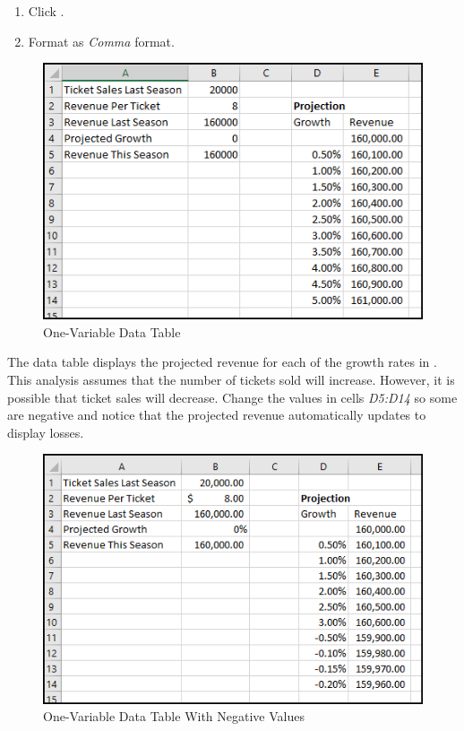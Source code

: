 \begin{enumerate}[resume]	
	\item Click .
	\item Format  as \textit{Comma} format.
\end{enumerate}

\begin{figure}[H]
	\centering
	\includegraphics[width=\maxwidth{.95\linewidth}]{gfx/ch08_fig42}
	\caption{One-Variable Data Table}
	\label{08:fig42}
\end{figure}

The data table displays the projected revenue for each of the growth rates in . This analysis assumes that the number of tickets sold will increase. However, it is possible that ticket sales will decrease. Change the values in cells \textit{D5:D14} so some are negative and notice that the projected revenue automatically updates to display losses.

\begin{figure}[H]
	\centering
	\includegraphics[width=\maxwidth{.95\linewidth}]{gfx/ch08_fig43}
	\caption{One-Variable Data Table With Negative Values}
	\label{08:fig43}
\end{figure}

